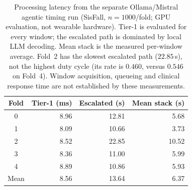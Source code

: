 \begin{table}[!t]
\centering
\caption{Processing latency from the separate Ollama/Mistral agentic timing run (SisFall, $n{=}1000$/fold; GPU evaluation, not wearable hardware). Tier-1 is evaluated for every window; the escalated path is dominated by local LLM decoding. Mean stack is the measured per-window average. Fold~2 has the slowest escalated path ($22.85$\,s), not the highest duty cycle (its rate is $0.460$, versus $0.546$ on Fold~4). Window acquisition, queueing and clinical response time are not established by these measurements.}
\label{tab:latency}
\begin{tabular}{crrr}
\toprule
Fold & Tier-1 (ms) & Escalated (s) & Mean stack (s) \\
\midrule
0 & 8.96 & 12.81 & 5.68 \\
1 & 8.09 & 10.66 & 3.73 \\
2 & 8.52 & 22.85 & 10.52 \\
3 & 8.36 & 11.00 & 5.99 \\
4 & 8.89 & 10.86 & 5.93 \\
\midrule
Mean & 8.56 & 13.64 & 6.37 \\
\bottomrule
\end{tabular}
\end{table}
